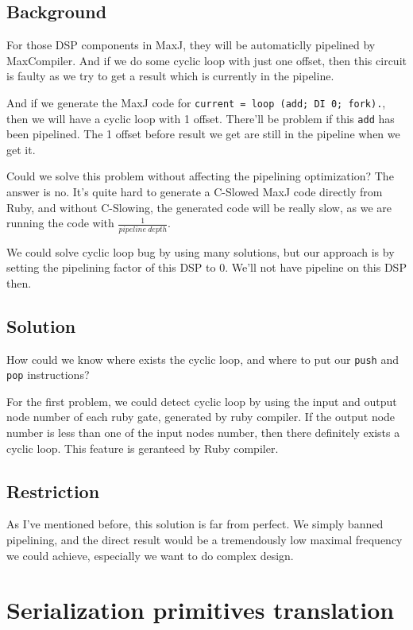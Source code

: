 \documentclass[a4paper, 10pt]{report}
\begin{document}
\subsection{Background}
For those DSP components in MaxJ, they will be automaticlly pipelined by MaxCompiler. And if we do some cyclic loop with just one offset, then this circuit is faulty as we try to get a result which is currently in the pipeline.

And if we generate the MaxJ code for \lstinline{current = loop (add; DI 0; fork).}, then we will have a cyclic loop with 1 offset. There'll be problem if this \texttt{add} has been pipelined. The 1 offset before result we get are still in the pipeline when we get it.

Could we solve this problem without affecting the pipelining optimization? The answer is no. It's quite hard to generate a C-Slowed MaxJ code directly from Ruby, and without C-Slowing, the generated code will be really slow, as we are running the code with $\frac{1}{pipeline\ depth}$.

We could solve cyclic loop bug by using many solutions, but our approach is by setting the pipelining factor of this DSP to 0. We'll not have pipeline on this DSP then.

\subsection{Solution}

How could we know where exists the cyclic loop, and where to put our \texttt{push} and \texttt{pop} instructions? 

For the first problem, we could detect cyclic loop by using the input and output node number of each ruby gate, generated by ruby compiler. If the output node number is less than one of the input nodes number, then there definitely exists a cyclic loop. This feature is geranteed by Ruby compiler.

\subsection{Restriction}

As I've mentioned before, this solution is far from perfect. We simply banned pipelining, and the direct result would be a tremendously low maximal frequency we could achieve, especially we want to do complex design.

\section{Serialization primitives translation}
\end{document}
